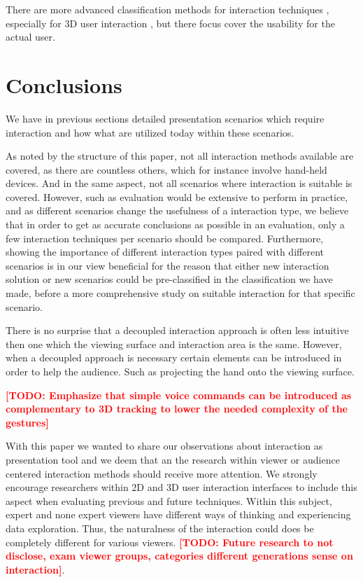\documentclass[review,journal]{vgtc}         %
\newcommand{\todo}[1]{\textbf{\textcolor{red}{[TODO: {#1}]}}}
\begin{document}
There are more advanced classification methods for interaction techniques \cite{stars:65-93:2012}, especially for 3D user interaction \cite{CGF:CGF194, Kettner95aclassification, 978-3-319-07458-0_1}, but there focus cover the usability for the actual user.

\section{Conclusions}\label{sec:conclusion}

We have in previous sections detailed presentation scenarios which require interaction and how what are utilized today within these scenarios.

As noted by the structure of this paper, not all interaction methods available are covered, as there are countless others, which for instance involve hand-held devices. And in the same aspect, not all scenarios where interaction is suitable is covered. However, such as evaluation would be extensive to perform in practice, and as different scenarios change the usefulness of a interaction type, we believe that in order to get as accurate conclusions as possible in an evaluation, only a few interaction techniques per scenario should be compared. Furthermore, showing the importance of different interaction types paired with different scenarios is in our view beneficial for the reason that either new interaction solution or new scenarios could be pre-classified in the classification we have made, before a more comprehensive study on suitable interaction for that specific scenario.

There is no surprise that a decoupled interaction approach is often less intuitive then one which the viewing surface and interaction area is the same.
However, when a decoupled approach is necessary certain elements can be introduced in order to help the audience.
Such as projecting the hand onto the viewing surface.

\todo{Emphasize that simple voice commands can be introduced as complementary to 3D tracking to lower the needed complexity of the gestures}

With this paper we wanted to share our observations about interaction as presentation tool and we deem that an the research within viewer or audience centered interaction methods should receive more attention. We strongly encourage researchers within 2D and 3D user interaction interfaces to include this aspect when evaluating previous and future techniques.
Within this subject, expert and none expert viewers have different ways of thinking and experiencing data exploration. Thus, the naturalness of the interaction could does be completely different for various viewers. \todo{Future research to not disclose, exam viewer groups, categories different generations sense on interaction}.



\end{document}
